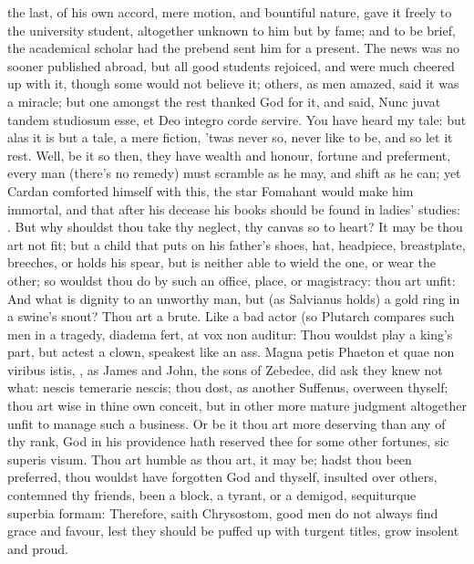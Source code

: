 {the last, of his own accord, mere motion, and bountiful nature, gave it
freely to the university student, altogether unknown to him but by
fame; and to be brief, the academical scholar had the prebend sent him
for a present. The news was no sooner published abroad, but all good
students rejoiced, and were much cheered up with it, though some would
not believe it; others, as men amazed, said it was a miracle; but one
amongst the rest thanked God for it, and said, Nunc juvat tandem
studiosum esse, et Deo integro corde servire. You have heard my tale:
but alas it is but a tale, a mere fiction, 'twas never so, never like
to be, and so let it rest. Well, be it so then, they have wealth and
honour, fortune and preferment, every man (there's no remedy) must
scramble as he may, and shift as he can; yet Cardan comforted himself
with this, the star Fomahant would make him immortal, and that
after his decease his books should be found in ladies' studies:
. But why shouldst thou take
thy neglect, thy canvas so to heart? It may be thou art not fit; but a
child that puts on his father's shoes, hat, headpiece,
breastplate, breeches, or holds his spear, but is neither able to wield
the one, or wear the other; so wouldst thou do by such an office,
place, or magistracy: thou art unfit: And what is dignity to an
unworthy man, but (as  Salvianus holds) a gold ring in a swine's
snout? Thou art a brute. Like a bad actor (so Plutarch compares
such men in a tragedy, diadema fert, at vox non auditur: Thou wouldst
play a king's part, but actest a clown, speakest like an ass.
Magna petis Phaeton et quae non viribus istis, \etc{}, as James and
John, the sons of Zebedee, did ask they knew not what: nescis temerarie
nescis; thou dost, as another Suffenus, overween thyself; thou art wise
in thine own conceit, but in other more mature judgment altogether
unfit to manage such a business. Or be it thou art more deserving than
any of thy rank, God in his providence hath reserved thee for some
other fortunes, sic superis visum. Thou art humble as thou art, it may
be; hadst thou been preferred, thou wouldst have forgotten God and
thyself, insulted over others, contemned thy friends, been a
block, a tyrant, or a demigod, sequiturque superbia formam:
Therefore, saith Chrysostom, good men do not always find grace
and favour, lest they should be puffed up with turgent titles, grow
insolent and proud.

}
